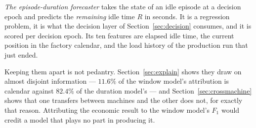 \emph{The episode-duration forecaster} takes the state of an idle
episode at a decision epoch and predicts the \emph{remaining} idle time
$R$ in seconds. It is a regression problem, it is what the decision
layer of Section~\ref{sec:decision} consumes, and it is scored per
decision epoch. Its ten features are elapsed idle time, the current
position in the factory calendar, and the load history of the
production run that just ended.

Keeping them apart is not pedantry. Section~\ref{sec:explain} shows they
draw on almost disjoint information --- $11.6\%$ of the window model's
attribution is calendar against $82.4\%$ of the duration model's --- and
Section~\ref{sec:crossmachine} shows that one transfers between machines
and the other does not, for exactly that reason. Attributing the
economic result to the window model's $F_1$ would credit a model that
plays no part in producing it.
